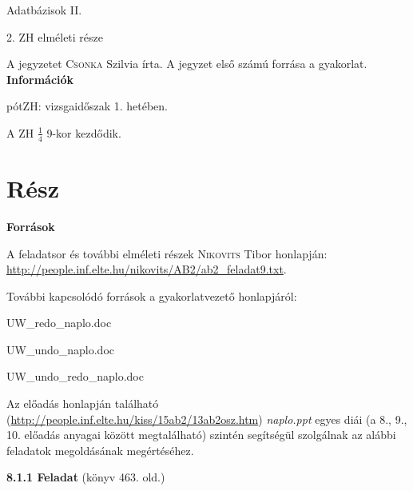 \documentclass[a4paper,11.5pt, table]{article}
\begin{document}
	\begin{center}
		{\LARGE Adatbázisok II.}
		\smallskip
		
		{\large 2. ZH elméleti része}
	\end{center}
	A jegyzetet \textsc{Csonka} Szilvia írta. A jegyzet első számú forrása a gyakorlat.\\
	
	
	
	
	
	\textbf{Információk}
	\begin{compactitem}
		\item pótZH: vizsgaidőszak 1. hetében.
		\item A ZH $\frac{1}{4}$ 9-kor kezdődik.
	\end{compactitem}
	
	\section{Rész}
	
	\textbf{Források}
	\begin{compactitem}
	\item A feladatsor és további elméleti részek \textsc{Nikovits} Tibor honlapján: \url{http://people.inf.elte.hu/nikovits/AB2/ab2_feladat9.txt}.
	
	\item További kapcsolódó források a gyakorlatvezető honlapjáról:
	\begin{compactitem}
		\item UW\_redo\_naplo.doc
		\item UW\_undo\_naplo.doc
		\item UW\_undo\_redo\_naplo.doc
	\end{compactitem}
	
	\item Az előadás honlapján található (\url{http://people.inf.elte.hu/kiss/15ab2/13ab2osz.htm}) \textit{naplo.ppt} egyes diái (a 8., 9., 10. előadás anyagai között megtalálható) szintén segítségül szolgálnak az alábbi feladatok megoldásának megértéséhez. 
	\end{compactitem}
	
	
	\textbf{8.1.1 Feladat} (könyv 463. old.)
	
\end{document}
